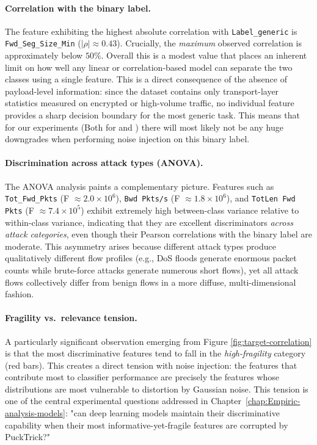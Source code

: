 \documentclass[../main.tex]{subfiles}
\begin{document}
\paragraph{Correlation with the binary label.}
The feature exhibiting the highest absolute correlation with \texttt{Label\_generic} is \texttt{Fwd\_Seg\_Size\_Min} ($|\rho| \approx 0.43$). Crucially, the \emph{maximum} observed correlation is approximately below $50\%$. Overall this is a modest value that places an inherent limit on how well any linear or correlation-based model can separate the two classes using a single feature. 
This is a direct consequence of the absence of payload-level information: since
the dataset contains only transport-layer statistics measured on encrypted or
high-volume traffic, no individual feature provides a sharp decision boundary for the most generic task. This means that for our experiments (Both for  and ) there will most likely not be any huge downgrades when performing noise injection on this binary label. 

\paragraph{Discrimination across attack types (ANOVA).}
The ANOVA analysis paints a complementary picture.  Features such as \texttt{Tot\_Fwd\_Pkts} (F $\approx 2.0 \times 10^6$), \texttt{Bwd Pkts/s} (F $\approx 1.8 \times 10^6$), and \texttt{TotLen Fwd Pkts} (F $\approx 7.4 \times 10^5$) exhibit extremely high between-class variance relative to within-class variance, indicating that they are excellent discriminators \emph{across attack categories}, even though their Pearson correlations with the binary label are moderate.  This asymmetry arises because different attack types produce qualitatively different flow profiles (e.g., DoS floods generate enormous packet counts while brute-force attacks generate numerous short flows), yet all attack flows collectively differ from benign flows in a more diffuse, multi-dimensional fashion.

\paragraph{Fragility vs.\ relevance tension.}
A particularly significant observation emerging from Figure \ref{fig:target-correlation} is that the most discriminative features tend to fall in the \emph{high-fragility} category (red bars).  This creates a direct tension with noise injection: the features that contribute most to classifier performance are precisely the features whose distributions are most vulnerable to distortion by Gaussian noise.  This tension is one of the central experimental questions addressed in Chapter~\ref{chap:Empiric-analysis-models}: "can deep learning models maintain their discriminative capability when their most informative-yet-fragile features are corrupted by PuckTrick?"
\end{document}

